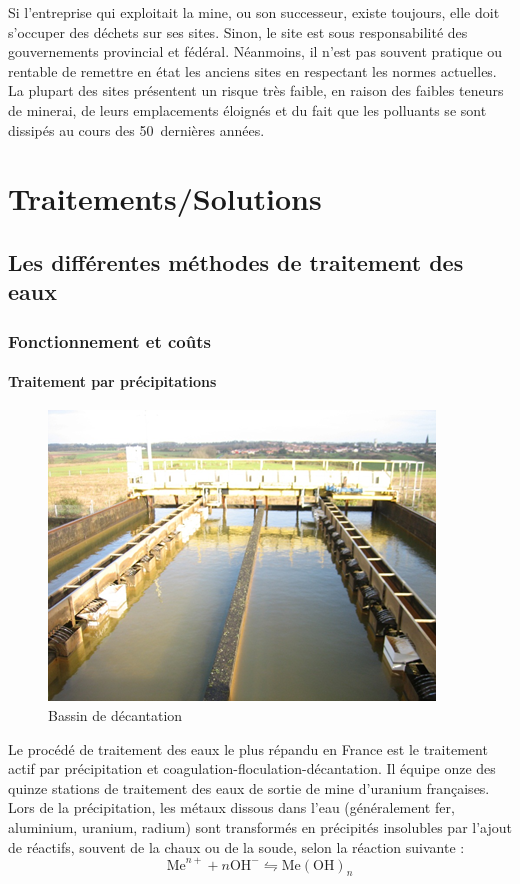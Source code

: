 \documentclass{article}
\begin{document}
Si l'entreprise qui exploitait la mine, ou son successeur, existe toujours, elle doit s'occuper des déchets sur ses sites. Sinon, le site est sous responsabilité des gouvernements provincial et fédéral. 
Néanmoins, il n'est pas souvent pratique ou rentable de remettre en état les anciens sites en respectant les normes actuelles. La plupart des sites présentent un risque très faible, en raison des faibles teneurs de minerai, de leurs emplacements éloignés et du fait que les polluants se sont dissipés au cours des 50~dernières années.

\newpage
\section{Traitements/Solutions}
\subsection{Les différentes méthodes de traitement des eaux}
\subsubsection{Fonctionnement et coûts}
\paragraph{Traitement par précipitations} \hspace{1 em}

\begin{figure}[H]
\centering
\includegraphics[width = 0.5\linewidth]{III_A_1.png}
\caption{Bassin de décantation}
\label{fig:bassin_decantation}
\end{figure}

Le procédé de traitement des eaux le plus répandu en France est le traitement actif par précipitation et coagulation-floculation-décantation. Il équipe onze des quinze stations de traitement des eaux de sortie de mine d'uranium françaises. 
Lors de la précipitation, les métaux dissous dans l’eau (généralement fer, aluminium, uranium, radium) sont transformés en précipités insolubles par l’ajout de réactifs, souvent de la chaux ou de la soude, selon la réaction suivante :   
$$\mathrm{Me}^{n+} + n\mathrm{OH}^- \leftrightharpoons \mathrm{Me(OH)}_{n}$$
          	
\end{document}
